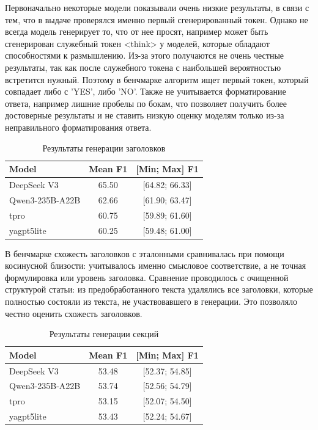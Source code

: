 \documentclass{article}
\theoremstyle{definition}
\theoremstyle{plain}
\begin{document}
Первоначально некоторые модели показывали очень низкие результаты, в связи с тем, что в выдаче проверялся именно первый сгенерированный токен. Однако не всегда модель генерирует то, что от нее просят, например может быть сгенерирован служебный
токен <think> у моделей, которые обладают способностями к размышлению. Из-за этого получаются не очень честные результаты, так как после служебного токена с наибольшей вероятностью встретится нужный. Поэтому в бенчмарке алгоритм ищет первый токен,
который совпадает либо с 'YES', либо 'NO'. Также не учитывается форматирование ответа, например лишние пробелы по бокам, что позволяет получить более достоверные результаты и не ставить низкую оценку моделям только из-за неправильного форматирования ответа.

\begin{table}[ht]
\centering
\caption{Результаты генерации заголовков}
\begin{tabular}{l|c|c}
\hline
\textbf{Model} & \textbf{Mean F1} & \textbf{[Min; Max] F1} \\
\hline
DeepSeek V3 & 65.50 & [64.82; 66.33] \\
Qwen3-235B-A22B  & 62.66 & [61.90; 63.47] \\
tpro & 60.75 & [59.89; 61.60] \\
yagpt5lite & 60.25 & [59.48; 61.00] \\
\hline
\end{tabular}
\end{table}

В бенчмарке схожесть заголовков с эталонными сравнивалась при помощи косинусной близости: учитывалось именно смысловое соответствие, а не точная формулировка или уровень заголовка. 
Сравнение проводилось с очищенной структурой статьи: из предобработанного текста удалялись все заголовки, которые полностью состояли из текста, не участвовавшего в генерации. Это позволяло честно оценить схожесть заголовков.


\begin{table}[ht]
\centering
\caption{Результаты генерации секций}
\begin{tabular}{l|c|c}
\hline
\textbf{Model} & \textbf{Mean F1} & \textbf{[Min; Max] F1} \\
\hline
DeepSeek V3 & 53.48 & [52.37; 54.85] \\
Qwen3-235B-A22B  & 53.74 & [52.56; 54.79] \\
tpro & 53.15 & [52.07; 54.50] \\
yagpt5lite & 53.43 & [52.24; 54.67] \\
\hline
\end{tabular}
\end{table}
\end{document}

